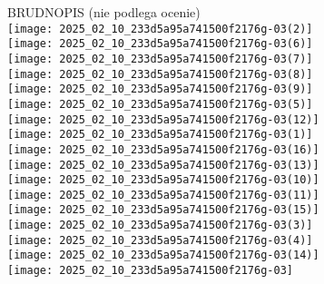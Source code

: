 \documentclass[10pt]{article}
\begin{document}
BRUDNOPIS (nie podlega ocenie)\\
\(\qquad\)\\
\texttt{[image: 2025\_02\_10\_233d5a95a741500f2176g-03(2)]}\\
\(\qquad\)\\
\texttt{[image: 2025\_02\_10\_233d5a95a741500f2176g-03(6)]}\\
\texttt{[image: 2025\_02\_10\_233d5a95a741500f2176g-03(7)]}\\
\texttt{[image: 2025\_02\_10\_233d5a95a741500f2176g-03(8)]}\\
\(\qquad\)\\
\texttt{[image: 2025\_02\_10\_233d5a95a741500f2176g-03(9)]}\\
\(\qquad\)\\
\(\qquad\)\\
\texttt{[image: 2025\_02\_10\_233d5a95a741500f2176g-03(5)]}\\
\texttt{[image: 2025\_02\_10\_233d5a95a741500f2176g-03(12)]}\\
\texttt{[image: 2025\_02\_10\_233d5a95a741500f2176g-03(1)]}\\
\texttt{[image: 2025\_02\_10\_233d5a95a741500f2176g-03(16)]}\\
\texttt{[image: 2025\_02\_10\_233d5a95a741500f2176g-03(13)]}\\
\(\qquad\)\\
\texttt{[image: 2025\_02\_10\_233d5a95a741500f2176g-03(10)]}\\
\texttt{[image: 2025\_02\_10\_233d5a95a741500f2176g-03(11)]}\\
\texttt{[image: 2025\_02\_10\_233d5a95a741500f2176g-03(15)]}\\
\texttt{[image: 2025\_02\_10\_233d5a95a741500f2176g-03(3)]}\\
\(\qquad\)\\
\texttt{[image: 2025\_02\_10\_233d5a95a741500f2176g-03(4)]}\\
\texttt{[image: 2025\_02\_10\_233d5a95a741500f2176g-03(14)]}\\
\texttt{[image: 2025\_02\_10\_233d5a95a741500f2176g-03]}
\end{document}

